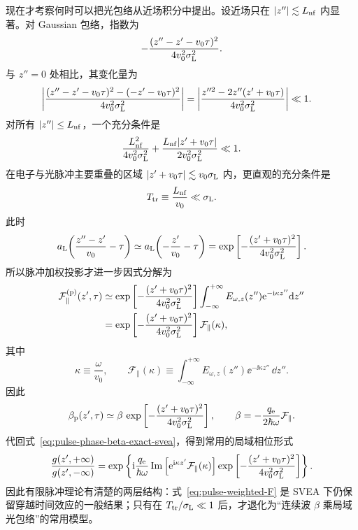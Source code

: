 现在才考察何时可以把光包络从近场积分中提出。设近场只在 $|z''|\lesssim L_{\rm nf}$ 内显著。对 Gaussian 包络，指数为
\begin{equation}
-\frac{(z''-z'-v_0\tau)^2}{4v_0^2\sigma_{\rm L}^2}.
\end{equation}
与 $z''=0$ 处相比，其变化量为
\begin{align}
 \left|
 \frac{(z''-z'-v_0\tau)^2-(-z'-v_0\tau)^2}
 {4v_0^2\sigma_{\rm L}^2}
 \right|
 &=\left|
 \frac{z''^2-2z''(z'+v_0\tau)}
 {4v_0^2\sigma_{\rm L}^2}
 \right|\ll1.
 \label{eq:pulse-freeze-exact}
\end{align}
对所有 $|z''|\le L_{\rm nf}$，一个充分条件是
\begin{equation}
 {
 \frac{L_{\rm nf}^2}{4v_0^2\sigma_{\rm L}^2}
 +\frac{L_{\rm nf}|z'+v_0\tau|}{2v_0^2\sigma_{\rm L}^2}
 \ll1.}
 \label{eq:pulse-freeze-condition}
\end{equation}
在电子与光脉冲主要重叠的区域 $|z'+v_0\tau|\lesssim v_0\sigma_{\rm L}$ 内，更直观的充分条件是
\begin{equation}
 {
 T_{\rm tr}\equiv\frac{L_{\rm nf}}{v_0}\ll\sigma_{\rm L}.}
 \label{eq:transit-condition}
\end{equation}
此时
\begin{equation}
 a_{\rm L}\!\left(\frac{z''-z'}{v_0}-\tau\right)
\simeq
 a_{\rm L}\!\left(-\frac{z'}{v_0}-\tau\right)
=
\exp\left[-\frac{(z'+v_0\tau)^2}{4v_0^2\sigma_{\rm L}^2}\right].
\label{eq:pulse-freeze}
\end{equation}
所以脉冲加权投影才进一步因式分解为
\begin{align}
\mathcal F_{\parallel}^{({\rm p})}(z',\tau)
&\simeq
\exp\left[-\frac{(z'+v_0\tau)^2}{4v_0^2\sigma_{\rm L}^2}\right]
\int_{-\infty}^{+\infty}
E_{\omega,z}(z'')\mathrm{e}^{-\mathrm{i}\kappa z''}\mathrm{d} z''\\
&=
\exp\left[-\frac{(z'+v_0\tau)^2}{4v_0^2\sigma_{\rm L}^2}\right]
\mathcal F_{\parallel}(\kappa),
\label{eq:pulse-F-factorization}
\end{align}
其中
\begin{equation}
 \kappa\equiv\frac{\omega}{v_0},
 \qquad
 \mathcal F_{\parallel}(\kappa)
 \equiv\int_{-\infty}^{+\infty}
 E_{\omega,z}(z'')\ee^{-\ii\kappa z''}\,\dd z''.
 \label{eq:Fdef}
\end{equation}
因此
\begin{equation}
\beta_{\rm p}(z',\tau)
\simeq
\beta\,
\exp\left[-\frac{(z'+v_0\tau)^2}{4v_0^2\sigma_{\rm L}^2}\right],
\qquad
\beta=-\frac{q_{\rm e}}{2\hbar\omega}\mathcal F_{\parallel}.
\label{eq:pulse-beta-factorization}
\end{equation}
代回式~\cref{eq:pulse-phase-beta-exact-svea}，得到常用的局域相位形式
\begin{equation}
 {
 \frac{g(z',+\infty)}{g(z',-\infty)}
 =\exp\left\{
 \mathrm{i}\frac{q_{\rm e}}{\hbar\omega}
 \operatorname{Im}\left[
 \mathrm{e}^{\mathrm{i}\kappa z'}\mathcal F_{\parallel}(\kappa)
 \right]
 \exp\left[-\frac{(z'+v_0\tau)^2}{4v_0^2\sigma_{\rm L}^2}\right]
 \right\}.}
 \label{eq:phase-final}
\end{equation}
因此有限脉冲理论有清楚的两层结构：式~\cref{eq:pulse-weighted-F} 是 SVEA 下仍保留穿越时间效应的一般结果；只有在 $T_{\rm tr}/\sigma_{\rm L}\ll1$ 后，才退化为“连续波 $\beta$ 乘局域光包络”的常用模型。


